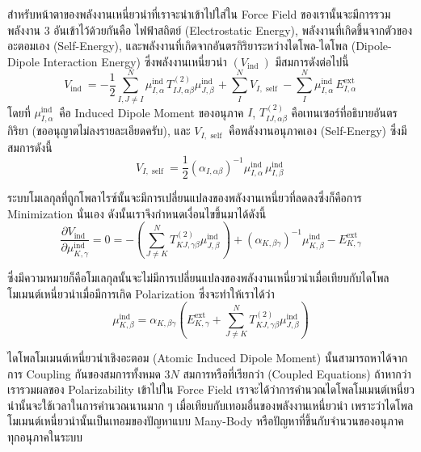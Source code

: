 สำหรับหน้าตาของพลังงานเหนี่ยวนำที่เราจะนำเข้าไปใส่ใน Force Field ของเรานั้นจะมีการรวมพลังงาน 3 อันเข้าไว้ด้วยกันคือ ไฟฟ้าสถิตย์ (Electrostatic Energy), พลังงานที่เกิดขึ้นจากตัวของอะตอมเอง (Self-Energy), และพลังงานที่เกิดจากอันตรกิริยาระหว่างไดโพล-ไดโพล (Dipole-Dipole Interaction Energy) ซึ่งพลังงานเหนี่ยวนำ $(V_{\text{ind }})$ มีสมการดังต่อไปนี้\autocite{vesely1977}
%
\begin{equation}
  V_{\text{ind }}
  =
  -\frac{1}{2} \sum_{I, J
    \neq I}^N \mu_{I, \alpha}^{\text{ind }} T_{I J, \alpha \beta}^{(2)}
  \mu_{J, \beta}^{\text{ind }}
  + \sum_I^N V_{I, \text{ self }}
  - \sum_I^N \mu_{I, \alpha}^{\text{ind }} E_{I, \alpha}^{\text{ext }}
\end{equation}
%
โดยที่ $\mu_{I, \alpha}^{\text{ind }}$ คือ Induced Dipole Moment ของอนุภาค $I$,
$T_{I J, \alpha \beta}^{(2)}$ คือเทนเซอร์ที่อธิบายอันตรกิริยา (ขออนุญาตไม่ลงรายละเอียดครับ), และ $V_{I, \text{ self }}$ คือพลังงานอนุภาคเอง (Self-Energy) ซึ่งมีสมการดังนี้
%
\begin{equation}
  V_{I, \text{ self }}
  =
  \frac{1}{2}\left(\alpha_{I, \alpha \beta}\right)^{-1} \mu_{I, \alpha}^{\text{ind }} \mu_{I, \beta}^{\text{ind }}
\end{equation}

ระบบโมเลกุลที่ถูกโพลาไรซ์นั้นจะมีการเปลี่ยนแปลงของพลังงานเหนี่ยวที่ลดลงซึ่งก็คือการ Minimization นั่นเอง ดังนั้นเราจึงกำหนดเงื่อนไขขึ้นมาได้ดังนี้
%
\begin{equation}
  \label{eq:der_induction_energy}
  \frac{\partial V_{\text{ind }}}{\partial \mu_{K, \gamma}^{\text{ind }}}
  =
  0
  =
  - \left(\sum_{J \neq K}^N T_{K J, \gamma \beta}^{(2)} \mu_{J, \beta}^{\text{ind }}\right)
  + \left(\alpha_{K, \beta \gamma}\right)^{-1} \mu_{K, \beta}^{\text{ind }}
  - E_{K, \gamma}^{\text{ext }}
\end{equation}

ซึ่งมีความหมายก็คือโมเลกุลนั้นจะไม่มีการเปลี่ยนแปลงของพลังงานเหนี่ยวนำเมื่อเทียบกับไดโพลโมเมนต์เหนี่ยวนำเมื่อมีการเกิด Polarization ซึ่งจะทำให้เราได้ว่า
%
\begin{equation}
  \label{eq:atomic_induced_dipole_moment}
  \mu_{K, \beta}^{\text{ind }}
  =
  \alpha_{K, \beta \gamma}
  \left(
  E_{K, \gamma}^{\mathrm{ext}}
  + \sum_{J \neq K}^N T_{K J, \gamma \beta}^{(2)} \mu_{J, \beta}^{\mathrm{ind}}
  \right)
\end{equation}

ไดโพลโมเมนต์เหนี่ยวนำเชิงอะตอม (Atomic Induced Dipole Moment) นั้นสามารถหาได้จากการ Coupling กันของสมการทั้งหมด $3 N$ สมการหรือที่เรียกว่า (Coupled Equations) ถ้าหากว่าเรารวมผลของ Polarizability เข้าไปใน Force Field เราจะได้ว่าการคำนวณไดโพลโมเมนต์เหนี่ยวนำนั้นจะใช้เวลาในการคำนวณนานมาก ๆ เมื่อเทียบกับเทอมอื่นของพลังงานเหนี่ยวนำ เพราะว่าไดโพลโมเมนต์เหนี่ยวนำนั้นเป็นเทอมของปัญหาแบบ Many-Body หรือปัญหาที่ขึ้นกับจำนวนของอนุภาคทุกอนุภาคในระบบ

